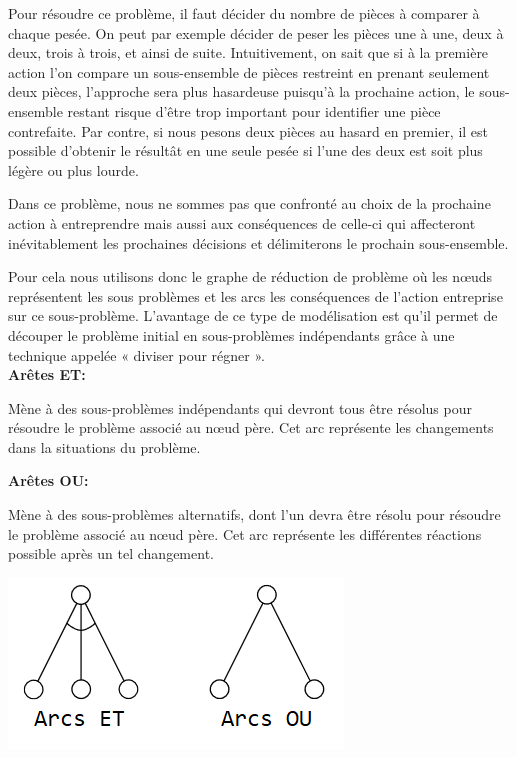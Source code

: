 Pour résoudre ce problème, il faut décider du nombre de pièces à comparer à chaque pesée. On peut par exemple décider de peser les pièces une à une, deux à deux, trois à trois, et ainsi de suite. Intuitivement, on sait que si à la première action l'on compare un sous-ensemble de pièces restreint en prenant seulement deux pièces, l'approche sera plus hasardeuse puisqu'à la prochaine action, le sous-ensemble restant risque d'être trop important pour identifier une pièce contrefaite. 
Par contre, si nous pesons deux pièces au hasard en premier, il est possible d'obtenir le résultât en une seule pesée si l'une des deux est soit plus légère ou plus lourde.

Dans ce problème, nous ne sommes pas que confronté au choix de la prochaine action à entreprendre mais aussi aux conséquences de celle-ci qui affecteront inévitablement les prochaines décisions et délimiterons le prochain sous-ensemble.

Pour cela nous utilisons donc le graphe de réduction de problème où les nœuds représentent les sous problèmes et les arcs les conséquences de l'action entreprise sur ce sous-problème. L'avantage de ce type de modélisation est qu'il permet de découper le problème initial en sous-problèmes indépendants grâce à une technique appelée « diviser pour régner ».\\

{\setlength{\parindent}{0cm}\textbf{Arêtes ET:}}

Mène à des sous-problèmes indépendants qui devront tous être résolus pour résoudre le problème associé au nœud père. Cet arc représente les changements dans la situations du problème.

{\setlength{\parindent}{0cm}\textbf{Arêtes OU:}}

Mène à des sous-problèmes alternatifs, dont l'un devra être résolu pour résoudre le problème associé au nœud père. Cet arc représente les différentes réactions possible après un tel changement.

\begin{center}
    \includegraphics[scale=0.8]{../ressources/images/ET_OU_arcs.png}
\end{center}

